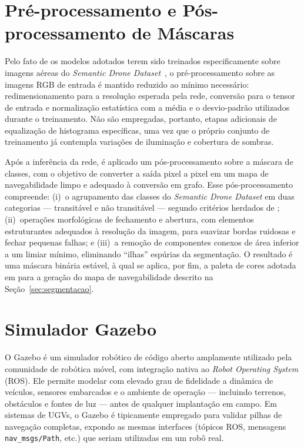 \documentclass[
    12pt,
    openright,
    oneside,
    a4paper,
    english,
    brazil
]{abntex2}
\begin{document}
\section{Pré-processamento e Pós-processamento de Máscaras}

Pelo fato de os modelos adotados \cite{junior2024_models} terem sido treinados especificamente sobre imagens aéreas do \emph{Semantic Drone Dataset}~\cite{drone_dataset}, o pré-processamento sobre as imagens RGB de entrada é mantido reduzido ao mínimo necessário: redimensionamento para a resolução esperada pela rede, conversão para o tensor de entrada e normalização estatística com a média e o desvio-padrão utilizados durante o treinamento. Não são empregadas, portanto, etapas adicionais de equalização de histograma específicas, uma vez que o próprio conjunto de treinamento já contempla variações de iluminação e cobertura de sombras.

Após a inferência da rede, é aplicado um pós-processamento sobre a máscara de classes, com o objetivo de converter a saída pixel a pixel em um mapa de navegabilidade limpo e adequado à conversão em grafo. Esse pós-processamento compreende: (i)~o agrupamento das classes do \emph{Semantic Drone Dataset} em duas categorias --- transitável e não transitável --- segundo critérios herdados de \cite{junior2024}; (ii)~operações morfológicas de fechamento e abertura, com elementos estruturantes adequados à resolução da imagem, para suavizar bordas ruidosas e fechar pequenas falhas; e (iii)~a remoção de componentes conexos de área inferior a um limiar mínimo, eliminando ``ilhas'' espúrias da segmentação. O resultado é uma máscara binária estável, à qual se aplica, por fim, a paleta de cores adotada em \cite{junior2025_rrt} para a geração do mapa de navegabilidade descrito na Seção~\ref{sec:segmentacao}.

\section{Simulador Gazebo}
\label{sec:gazebo}

O Gazebo \cite{koenig2004} é um simulador robótico de código aberto amplamente utilizado pela comunidade de robótica móvel, com integração nativa ao \emph{Robot Operating System} (ROS). Ele permite modelar com elevado grau de fidelidade a dinâmica de veículos, sensores embarcados e o ambiente de operação --- incluindo terrenos, obstáculos e fontes de luz --- antes de qualquer implantação em campo. Em sistemas de UGVs, o Gazebo é tipicamente empregado para validar pilhas de navegação completas, expondo as mesmas interfaces (tópicos ROS, mensagens \texttt{nav\_msgs/Path}, etc.) que seriam utilizadas em um robô real.
\end{document}
